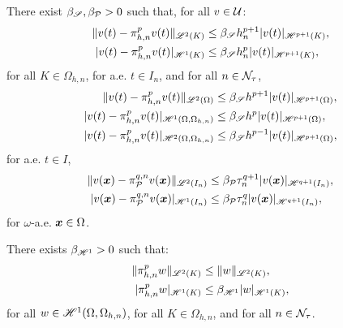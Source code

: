 \begin{lemma} %
    There exist $\beta_{\mathscr{S}}, \beta_{\mathcal{P}_{}} > 0$ such that, for all $v \in \mathcal{U}$:
    \begin{align}
        \lVert v(t) - \pi_{h, n}^p v(t) \rVert_{\mathscr{L}^{2}(K)} &\leq \beta_{\mathscr{S}} h_n^{p + 1} \lvert v(t) \rvert_{\mathscr{H}^{p + 1}(K)}, \\
        \lvert v(t) - \pi_{h, n}^p v(t) \rvert_{\mathscr{H}^{1}(K)} &\leq \beta_{\mathscr{S}} h_n^{p} \lvert v(t) \rvert_{\mathscr{H}^{p + 1}(K)},
    \end{align}
    for all $K \in \Omega_{h, n}$, for a.e. $t \in I_n$, and for all $n \in \mathcal{N}_{\tau}$,
    \begin{align}
        \lVert v(t) - \pi_{h, n}^p v(t) \rVert_{\mathscr{L}^{2}(\Omega)} &\leq \beta_{\mathscr{S}} h^{p + 1} \lvert v(t) \rvert_{\mathscr{H}^{p + 1}(\Omega)}, \\
        \lvert v(t) - \pi_{h, n}^p v(t) \rvert_{\mathscr{H}^{1}(\Omega, \Omega_{h, n})} &\leq \beta_{\mathscr{S}} h^{p} \lvert v(t) \rvert_{\mathscr{H}^{p + 1}(\Omega)}, \\
        \lvert v(t) - \pi_{h, n}^p v(t) \rvert_{\mathscr{H}^{2}(\Omega, \Omega_{h, n})} &\leq \beta_{\mathscr{S}} h^{p - 1} \lvert v(t) \rvert_{\mathscr{H}^{p + 1}(\Omega)},
    \end{align}
    for a.e. $t \in I$,
    \begin{align}
        \lVert v(\bm{x}) - \pi_{\mathcal{P}_{}}^{q, n} v(\bm{x}) \rVert_{\mathscr{L}^{2}(I_n)} &\leq \beta_{\mathcal{P}_{}} \tau_n^{q + 1} \lvert v(\bm{x}) \rvert_{\mathscr{H}^{q + 1}(I_n)}, \\
        \lvert v(\bm{x}) - \pi_{\mathcal{P}_{}}^{q, n} v(\bm{x}) \rvert_{\mathscr{H}^{1}(I_n)} &\leq \beta_{\mathcal{P}_{}} \tau_n^{q} \lvert v(\bm{x}) \rvert_{\mathscr{H}^{q + 1}(I_n)},
    \end{align}
    for $\omega$-a.e. $\bm{x} \in \Omega$.
\end{lemma}

\begin{lemma}
    There exists $\beta_{\mathscr{H}^{1}} > 0$ such that:
    \begin{align}
        \lVert \pi_{h, n}^p w \rVert_{\mathscr{L}^{2}(K)} &\leq \lVert w \rVert_{\mathscr{L}^{2}(K)}, \\
        \lvert \pi_{h, n}^p w \rvert_{\mathscr{H}^{1}(K)} &\leq \beta_{\mathscr{H}^{1}} \lvert w \rvert_{\mathscr{H}^{1}(K)},
    \end{align}
    for all $w \in \mathscr{H}^{1}(\Omega, \Omega_{h, n})$, for all $K \in \Omega_{h, n}$, and for all $n \in \mathcal{N}_{\tau}$.
\end{lemma}


